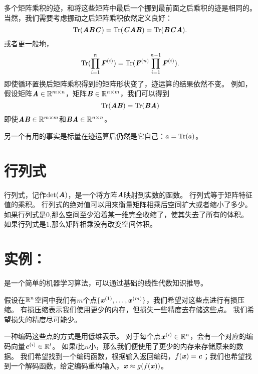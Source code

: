 多个矩阵乘积的迹，和将这些矩阵中最后一个挪到最前面之后乘积的迹是相同的。
当然，我们需要考虑挪动之后矩阵乘积依然定义良好：
\begin{equation}
\Tr(\MA\MB\MC)=\Tr(\MC\MA\MB)= \Tr(\MB\MC\MA).
\end{equation}
或者更一般地，
\begin{equation}
\Tr(\prod_{i=1}^n \MF^{(i)})= \Tr(\MF^{(n)} \prod_{i=1}^{n-1} \MF^{(i)}).
\end{equation}
即使循环置换后矩阵乘积得到的矩阵形状变了，迹运算的结果依然不变。
例如，假设矩阵$\MA\in \SetR^{m\times n}$，矩阵$\MB\in \SetR^{n\times m}$，我们可以得到
\begin{equation} 
    \Tr(\MA\MB)= \Tr(\MB\MA)
\end{equation}
即使$\MA\MB \in \SetR^{m\times m}$和$\MB\MA \in \SetR^{n\times n}$。



另一个有用的事实是标量在迹运算后仍然是它自己：$a=\Tr(a)$。




\section{行列式}
\label{sec:the_determinant}

行列式，记作$\text{det}(\MA)$，是一个将方阵$\MA$映射到实数的函数。
行列式等于矩阵特征值的乘积。
行列式的绝对值可以用来衡量矩阵相乘后空间扩大或者缩小了多少。
如果行列式是$0$,那么空间至少沿着某一维完全收缩了，使其失去了所有的体积。
如果行列式是$1$,那么矩阵相乘没有改变空间体积。




\section{实例：}
\label{sec:example_principal_components_analysis_chap2}

是一个简单的机器学习算法，可以通过基础的线性代数知识推导。


假设在$\SetR^n$空间中我们有$m$个点$\{\Vx^{(1)}, \dots ,\Vx^{(m)}\}$，我们希望对这些点进行有损压缩。
有损压缩表示我们使用更少的内存，但损失一些精度去存储这些点。
我们希望损失的精度尽可能少。


一种编码这些点的方式是用低维表示。
对于每个点$\Vx^{(i)} \in \SetR^n$，会有一个对应的编码向量$\Vc^{(i)}\in \SetR^l$。
如果$l$比$n$小，那么我们便使用了更少的内存来存储原来的数据。
我们希望找到一个编码函数，根据输入返回编码，$f(\Vx)=\Vc$；我们也希望找到一个解码函数，给定编码重构输入，$\Vx\approx g(f(\Vx))$。



